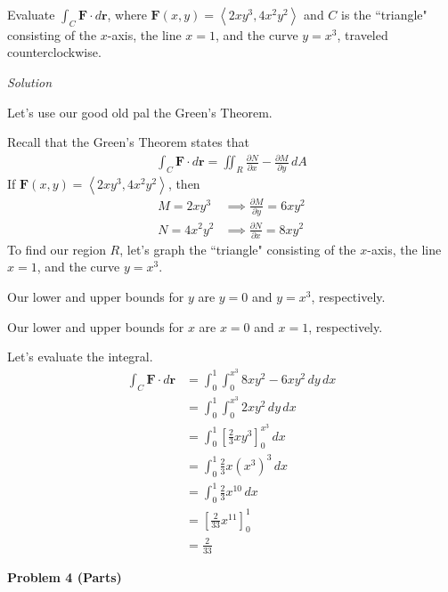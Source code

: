\documentclass{article}
\newcommand{\lra}[1]{\left\langle #1 \right\rangle}
\newcommand{\lrb}[1]{\left[ #1 \right]}
\renewcommand{\r}[0]{\mathbf{r}}
\newcommand{\F}[0]{\mathbf{F}}
\newcommand{\Solution}{\textit{Solution}}
\begin{document}
Evaluate $\displaystyle \int_C \F\cdot d\r$, where $\F(x,y)=\lra{2xy^3,4x^2y^2}$ and $C$ is the ``triangle" consisting of the $x$-axis, the line $x=1$, and the curve $y=x^3$, traveled counterclockwise.

\Solution

Let's use our good old pal the Green's Theorem.

Recall that the Green's Theorem states that
\begin{align*}
    \int_C \mathbf{F} \cdot d\mathbf{r} = \iint_R \frac{\partial N}{\partial x} - \frac{\partial M}{\partial y}\,dA
\end{align*}
If $\F(x,y)=\lra{2xy^3,4x^2y^2}$, then
\begin{align*}
    M=2xy^3&\implies \frac{\partial M}{\partial y}= 6xy^2\\
    N=4x^2y^2&\implies \frac{\partial N}{\partial x}=8xy^2
\end{align*}
To find our region $R$, let's graph  the ``triangle" consisting of the $x$-axis, the line $x=1$, and the curve $y=x^3$.
\begin{center}
\end{center}
Our lower and upper bounds for $y$ are $y=0$ and $y=x^3$, respectively.

Our lower and upper bounds for $x$ are $x=0$ and $x=1$, respectively.

Let's evaluate the integral.
\begin{align*}
    \int_C \F\cdot d\r&=\int_0^1\int_0^{x^3}8xy^2-6xy^2\,dy\,dx\\
    &=\int_0^1 \int_0^{x^3}2xy^2\,dy\,dx\\
    &=\int_0^1\lrb{\frac{2}{3}xy^3}_0^{x^3}\,dx\\
    &=\int_0^1 \frac{2}{3}x(x^3)^3\,dx\\
    &=\int_0^1 \frac{2}{3}x^{10}\,dx\tag{$x(x^3)^3=x(x^9)=x^10$}\\
    &=\lrb{\frac{2}{33}x^{11}}_0^1\\
    &=\boxed{\frac{2}{33}}
\end{align*}
\newpage
{}
{}\textbf{Problem 4 (Parts)}
\end{document}
